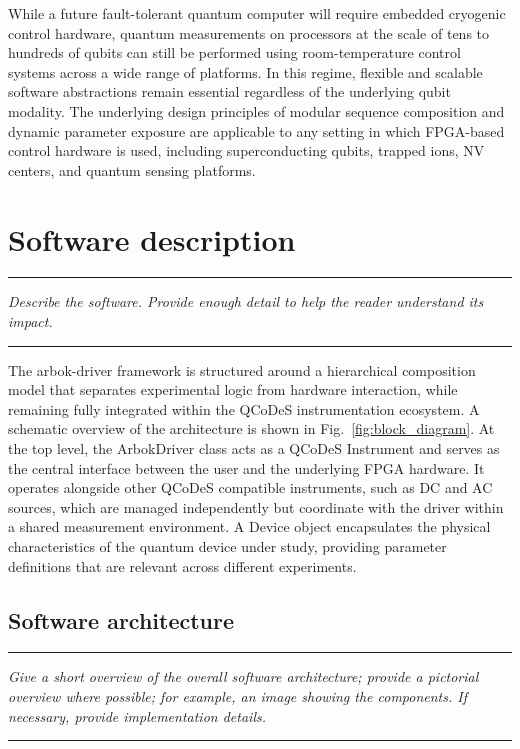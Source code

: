 \documentclass[numbers, preprint, twocolumn,10pt]{elsarticle}
\newenvironment{instructions}
  {\hrule\vspace{4pt}\begingroup\color{red}\itshape}
  {\endgroup\hrule\vspace{4pt}}
\begin{document}
While a future fault-tolerant quantum computer will require embedded cryogenic control hardware\cite{patra_cryo-cmos_2018, hornibrook_cryogenic_2015, xue_cmos-based_2021}, quantum measurements on processors at the scale of tens to hundreds of qubits can still be performed using room-temperature control systems across a wide range of platforms. In this regime, flexible and scalable software abstractions remain essential regardless of the underlying qubit modality. The underlying design principles of modular sequence composition and dynamic parameter exposure are applicable to any setting in which FPGA-based control hardware is used, including superconducting qubits, trapped ions, NV centers, and quantum sensing platforms.

\section{Software description}

\begin{instructions}
    Describe the software. Provide enough detail to help the reader understand its impact.
\end{instructions}
\noindent
The arbok-driver framework is structured around a hierarchical composition model that separates experimental logic from hardware interaction, while remaining fully integrated within the QCoDeS instrumentation ecosystem.
A schematic overview of the architecture is shown in Fig.~\ref{fig:block_diagram}.
At the top level, the ArbokDriver class acts as a QCoDeS Instrument and serves as the central interface between the user and the underlying FPGA hardware.
It operates alongside other QCoDeS compatible instruments, such as DC and AC sources, which are managed independently but coordinate with the driver within a shared measurement environment.
A Device object encapsulates the physical characteristics of the quantum device under study, providing parameter definitions that are relevant across different experiments.

\subsection{Software architecture}

\begin{instructions}
    Give a short overview of the overall software architecture; provide a pictorial overview where possible; for example, an image showing the components. If necessary, provide implementation details.
\end{instructions}
\end{document}
